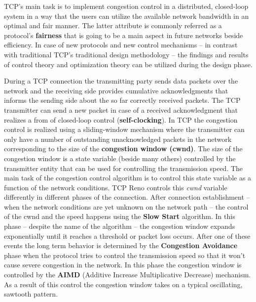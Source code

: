\documentclass[a4paper]{article}
\begin{document}
TCP's main task is to implement congestion control in a distributed, closed-loop system in a way that the users can
utilize the available network bandwidth in an optimal and fair manner. The latter attribute is commonly referred as a
protocol's \textbf{fairness} that is going to be a main aspect in future networks beside efficiency. In case of new
protocols and new control mechanisms -- in contrast with traditional TCP's traditional design methodology -- the
findings and results of control theory and optimization theory can be utilized during the design phase.

During a TCP connection the transmitting party sends data packets over the network and the receiving side provides
cumulative acknowledgments that informs the sending side about the so far correctly received packets. The TCP
transmitter can send a new packet in case of a received acknowledgment that realizes a from of closed-loop control
(\textbf{self-clocking}). In TCP the congestion control is realized using a sliding-window mechanism where the
transmitter can only have a number of outstanding unacknowledged packets in the network corresponding to the size of
the \textbf{congestion window (cwnd)}. The size of the congestion window is a state variable (beside many others)
controlled by the transmitter entity that can be used for controlling the transmission speed. The main task of the
congestion control algorithm is to control this state variable as a function of the network conditions. TCP Reno
controls this \emph{cwnd} variable differently in different phases of the connection. After connection establishment --
when the network conditions are yet unknown on the network path -- the control of the cwnd and the speed happens using
the \textbf{Slow Start} algorithm. In this phase -- despite the name of the algorithm -- the congestion window expands
exponentially until it reaches a threshold or packet loss occurs. After one of these events the long term behavior is
determined by the \textbf{Congestion Avoidance} phase when the protocol tries to control the transmission speed so that
it won't cause severe congestion in the network. In this phase the congestion window is controlled by the \textbf{AIMD}
(Additive Increase Multiplicative Decrease) mechanism. As a result of this control the congestion window takes on a
typical oscillating, sawtooth pattern.
\end{document}
